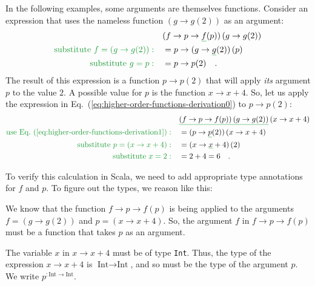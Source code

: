 In the following examples, some arguments are themselves functions.
Consider an expression that uses the nameless function $\left(g\rightarrow g(2)\right)$
as an argument:
\begin{align}
 & (f\rightarrow p\rightarrow\gunderline f(p))\left(g\rightarrow g(2)\right)\label{eq:higher-order-functions-derivation0}\\
{\color{greenunder}\text{substitute }f=\left(g\rightarrow g(2)\right):}\quad & =p\rightarrow(g\rightarrow\gunderline g(2))\,(p)\nonumber \\
{\color{greenunder}\text{substitute }g=p:}\quad & =p\rightarrow p(2)\quad.\label{eq:higher-order-functions-derivation1}
\end{align}
The result of this expression is a function $p\rightarrow p(2)$ that
will apply \emph{its} argument $p$ to the value $2$. A possible
value for $p$ is the function $x\rightarrow x+4$. So, let us apply
the expression in Eq.~(\ref{eq:higher-order-functions-derivation0})
to $p\rightarrow p(2)$:
\begin{align*}
 & \gunderline{\left(f\rightarrow p\rightarrow f(p)\right)\left(g\rightarrow g(2)\right)}\left(x\rightarrow x+4\right)\\
{\color{greenunder}\text{use Eq.~(\ref{eq:higher-order-functions-derivation1})}:}\quad & =(p\rightarrow\gunderline p(2))\left(x\rightarrow x+4\right)\\
{\color{greenunder}\text{substitute }p=\left(x\rightarrow x+4\right):}\quad & =(x\rightarrow\gunderline x+4)\left(2\right)\\
{\color{greenunder}\text{substitute }x=2:}\quad & =2+4=6\quad.
\end{align*}

To verify this calculation in Scala, we need to add appropriate type
annotations for $f$ and $p$. To figure out the types, we reason
like this:

We know that the function $f\rightarrow p\rightarrow f(p)$ is being
applied to the arguments $f=\left(g\rightarrow g(2)\right)$ and $p=\left(x\rightarrow x+4\right)$.
So, the argument $f$ in $f\rightarrow p\rightarrow f(p)$ must be
a function that takes $p$ as an argument.

The variable $x$ in $x\rightarrow x+4$ must be of type \lstinline!Int!.
Thus, the type of the expression $x\rightarrow x+4$ is $\text{Int}\rightarrow\text{Int}$,
and so must be the type of the argument $p$. We write $p^{:\text{Int}\rightarrow\text{Int}}$.

